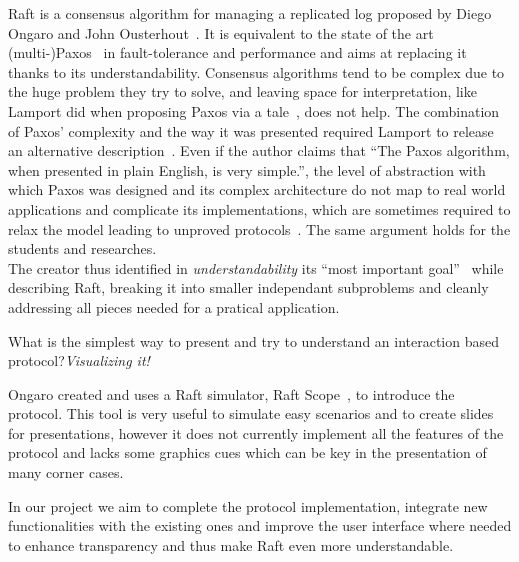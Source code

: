 Raft is a consensus algorithm for managing a replicated log
proposed by Diego Ongaro and John Ousterhout~\cite{ongaro2014search}.
It is equivalent to the state of the art (multi-)Paxos~\cite{lamport1998part} in fault-tolerance and performance and
aims at replacing it thanks to its understandability.
Consensus algorithms tend to be complex due to the huge problem they try to solve,
and leaving space for interpretation, like Lamport
did when proposing Paxos via a tale~\cite{lamport1998part}, does not help.
The combination of Paxos' complexity and the way it was presented required
Lamport to release an alternative description~\cite{lamport2001paxos}.
Even if the author claims that ``The Paxos algorithm, when presented in plain
English, is very simple.'', the level of abstraction
with which Paxos was designed and its complex architecture do not map
to real world applications and complicate its implementations, which are sometimes
required to relax the model leading to unproved protocols~\cite{chandra2007paxos}.
The same argument holds for the students and researches.\\
The creator thus identified in \emph{understandability} its ``most important goal''~\cite{ongaro2014consensus}
while describing Raft, breaking it into smaller independant subproblems and cleanly addressing all pieces needed
for a pratical application.

What is the simplest way to present and try to understand an interaction based
protocol?\emph{Visualizing it!}

Ongaro created and uses a Raft simulator, Raft Scope~\cite{raftscope}, to introduce the protocol.
This tool is very useful to simulate easy scenarios and to create slides for presentations,
however it does not currently implement all the features of the protocol and lacks
some graphics cues which can be key in the presentation of many corner cases.

In our project we aim to complete the protocol implementation, integrate new
functionalities with the existing ones and improve the user interface where needed to
enhance transparency and thus make Raft even more understandable.
